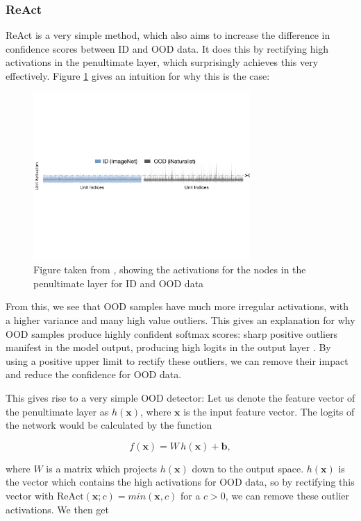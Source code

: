 \documentclass[UKenglish]{uiomasterthesis} %
\theoremstyle{definition}
\begin{document}
\subsubsection{ReAct}

ReAct \cite{react} is a very simple method, which also aims to increase the difference in confidence scores between ID and OOD data. It does this by rectifying high activations in the penultimate layer, which surprisingly achieves this very effectively. Figure \ref{react} gives an intuition for why this is the case:

\begin{figure}[h]
\centerline{\includegraphics[width=3.25in]{figure/react.pdf}}
\caption{Figure taken from \cite{react}, showing the activations for the nodes in the penultimate layer for ID and OOD data}
\label{react}
\end{figure}

From this, we see that OOD samples have much more irregular activations, with a higher variance and many high value outliers. This gives an explanation for why OOD samples produce highly confident softmax scores: sharp positive outliers manifest in the model output, producing high logits in the output layer \cite{react}. By using a positive upper limit to rectify these outliers, we can remove their impact and reduce the confidence for OOD data.

This gives rise to a very simple OOD detector: Let us denote the feature vector of the penultimate layer as $h(\bm{x})$, where $\bm{x}$ is the input feature vector. The logits of the network would be calculated by the function

\begin{equation}\label{dog}
  f(\bm{x}) = W \, h(\bm{x}) + \bm{b},
\end{equation}

where $W$ is a matrix which projects $h(\bm{x})$ down to the output space. $h(\bm{x})$ is the vector which contains the high activations for OOD data, so by rectifying this vector with $\text{ReAct}(\bm{x}; c) = min(\bm{x}, c)$ for a $c > 0$, we can remove these outlier activations. We then get
\end{document}
